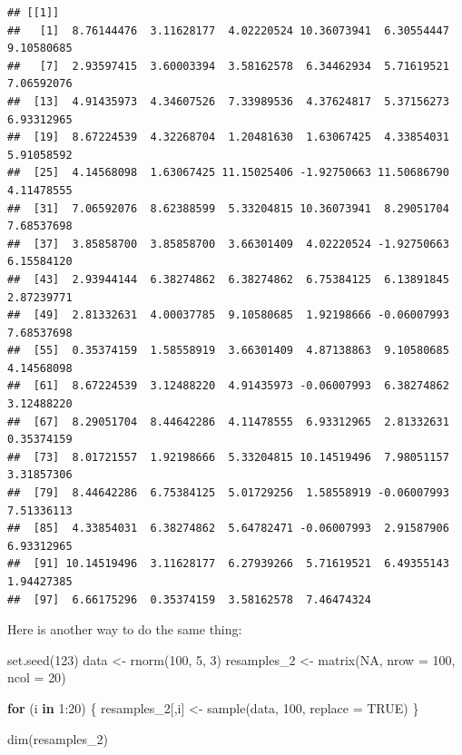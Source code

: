 \documentclass[
]{book}
\newenvironment{Shaded}{\begin{snugshade}}{\end{snugshade}}
\newcommand{\AttributeTok}[1]{\textcolor[rgb]{0.77,0.63,0.00}{#1}}
\newcommand{\ConstantTok}[1]{\textcolor[rgb]{0.00,0.00,0.00}{#1}}
\newcommand{\ControlFlowTok}[1]{\textcolor[rgb]{0.13,0.29,0.53}{\textbf{#1}}}
\newcommand{\DecValTok}[1]{\textcolor[rgb]{0.00,0.00,0.81}{#1}}
\newcommand{\FunctionTok}[1]{\textcolor[rgb]{0.00,0.00,0.00}{#1}}
\newcommand{\NormalTok}[1]{#1}
\newcommand{\OtherTok}[1]{\textcolor[rgb]{0.56,0.35,0.01}{#1}}
\newcommand{\SpecialCharTok}[1]{\textcolor[rgb]{0.00,0.00,0.00}{#1}}
\begin{document}
\begin{verbatim}
## [[1]]
##   [1]  8.76144476  3.11628177  4.02220524 10.36073941  6.30554447  9.10580685
##   [7]  2.93597415  3.60003394  3.58162578  6.34462934  5.71619521  7.06592076
##  [13]  4.91435973  4.34607526  7.33989536  4.37624817  5.37156273  6.93312965
##  [19]  8.67224539  4.32268704  1.20481630  1.63067425  4.33854031  5.91058592
##  [25]  4.14568098  1.63067425 11.15025406 -1.92750663 11.50686790  4.11478555
##  [31]  7.06592076  8.62388599  5.33204815 10.36073941  8.29051704  7.68537698
##  [37]  3.85858700  3.85858700  3.66301409  4.02220524 -1.92750663  6.15584120
##  [43]  2.93944144  6.38274862  6.38274862  6.75384125  6.13891845  2.87239771
##  [49]  2.81332631  4.00037785  9.10580685  1.92198666 -0.06007993  7.68537698
##  [55]  0.35374159  1.58558919  3.66301409  4.87138863  9.10580685  4.14568098
##  [61]  8.67224539  3.12488220  4.91435973 -0.06007993  6.38274862  3.12488220
##  [67]  8.29051704  8.44642286  4.11478555  6.93312965  2.81332631  0.35374159
##  [73]  8.01721557  1.92198666  5.33204815 10.14519496  7.98051157  3.31857306
##  [79]  8.44642286  6.75384125  5.01729256  1.58558919 -0.06007993  7.51336113
##  [85]  4.33854031  6.38274862  5.64782471 -0.06007993  2.91587906  6.93312965
##  [91] 10.14519496  3.11628177  6.27939266  5.71619521  6.49355143  1.94427385
##  [97]  6.66175296  0.35374159  3.58162578  7.46474324
\end{verbatim}

Here is another way to do the same thing:

\begin{Shaded}
\begin{Highlighting}[]
\FunctionTok{set.seed}\NormalTok{(}\DecValTok{123}\NormalTok{)}
\NormalTok{data }\OtherTok{\textless{}{-}} \FunctionTok{rnorm}\NormalTok{(}\DecValTok{100}\NormalTok{, }\DecValTok{5}\NormalTok{, }\DecValTok{3}\NormalTok{)}
\NormalTok{resamples\_2 }\OtherTok{\textless{}{-}} \FunctionTok{matrix}\NormalTok{(}\ConstantTok{NA}\NormalTok{, }\AttributeTok{nrow =} \DecValTok{100}\NormalTok{, }\AttributeTok{ncol =} \DecValTok{20}\NormalTok{)}

\ControlFlowTok{for}\NormalTok{ (i }\ControlFlowTok{in} \DecValTok{1}\SpecialCharTok{:}\DecValTok{20}\NormalTok{) \{}
\NormalTok{  resamples\_2[,i] }\OtherTok{\textless{}{-}} \FunctionTok{sample}\NormalTok{(data, }\DecValTok{100}\NormalTok{, }\AttributeTok{replace =} \ConstantTok{TRUE}\NormalTok{)}
\NormalTok{\}}

\FunctionTok{dim}\NormalTok{(resamples\_2)}
\end{Highlighting}
\end{Shaded}
\end{document}

